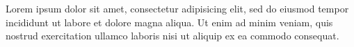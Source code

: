 \documentclass{article}
\begin{document}
Lorem ipsum dolor sit amet, consectetur adipisicing elit, sed do eiusmod
tempor incididunt ut labore et dolore magna aliqua. Ut enim ad minim
veniam, quis nostrud exercitation ullamco laboris nisi ut aliquip ex ea
commodo consequat.
\end{document}
